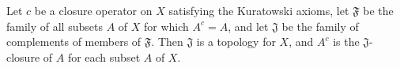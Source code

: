 Let $c$ be a closure operator on $X$ satisfying the Kuratowski axioms, let $\mathfrak{F}$ be the family of all subsets $A$ of $X$ for which $A^{c} = A$, and let $\mathfrak{J}$ be the family of complements of members of $\mathfrak{F}$. Then $\mathfrak{J}$ is a topology for $X$, and $A^{c}$ is the $\mathfrak{J}$-closure of $A$ for each subset $A$ of $X$.
